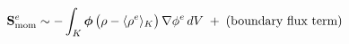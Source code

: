\documentclass[preview]{standalone}
\begin{document}
\begin{align*}
\special{dvisvgm:raw <g id='unique000'>}\mathbf{S}_{\text{mom}}^{e} \sim -\int_K \boldsymbol{\phi}\,\big(\rho - \langle\rho^e\rangle_K\big)\, \nabla\phi^e\, dV\;+\;\text{(boundary flux term)}\special{dvisvgm:raw </g>}
\end{align*}
\end{document}
